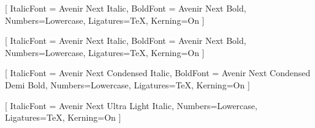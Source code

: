 





\renewcommand{\acvSectionContentTopSkip}{0.5em}



\setmainfont{Avenir Next}[
	ItalicFont = {Avenir Next Italic},
	BoldFont = {Avenir Next Bold},
	Numbers=Lowercase,
	Ligatures=TeX,
	Kerning=On
]

\newfontfamily{}[
	ItalicFont = {Avenir Next Italic},
	BoldFont = {Avenir Next Bold},
	Numbers=Lowercase,
	Ligatures=TeX,
	Kerning=On
]

\newfontfamily{}[
	ItalicFont = {Avenir Next Condensed Italic},
	BoldFont = {Avenir Next Condensed Demi Bold},
	Numbers=Lowercase,
	Ligatures=TeX,
	Kerning=On
]

\newfontfamily{}[
	ItalicFont = {Avenir Next Ultra Light Italic},
	Numbers=Lowercase,
	Ligatures=TeX,
	Kerning=On
]

\renewcommand*{\headerfont}{\avenirnext}
\renewcommand*{\headerfontlight}{\avenirnextultralight}
\renewcommand*{\footerfont}{\avenirnext}
\renewcommand*{\bodyfont}{\avenirnext}
\renewcommand*{\bodyfontlight}{\avenirnext}

